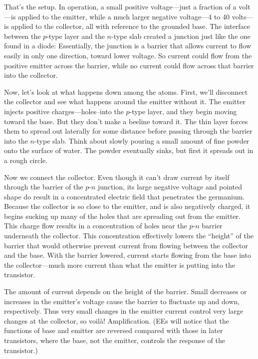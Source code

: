 \documentclass[12pt]{article}
\begin{document}
That’s the setup. In operation, a small positive voltage---just a fraction of a volt---is applied to the emitter, while a much larger negative voltage---4 to 40 volts---is applied to the collector, all with reference to the grounded base. The interface between the $p$-type layer and the $n$-type slab created a junction just like the one found in a diode: Essentially, the junction is a barrier that allows current to flow easily in only one direction, toward lower voltage. So current could flow from the positive emitter across the barrier, while no current could flow across that barrier into the collector.

Now, let’s look at what happens down among the atoms. First, we’ll disconnect the collector and see what happens around the emitter without it. The emitter injects positive charges---holes--into the $p$-type layer, and they begin moving toward the base. But they don’t make a beeline toward it. The thin layer forces them to spread out laterally for some distance before passing through the barrier into the $n$-type slab. Think about slowly pouring a small amount of fine powder onto the surface of water. The powder eventually sinks, but first it spreads out in a rough circle.

Now we connect the collector. Even though it can’t draw current by itself through the barrier of the $p$-$n$ junction, its large negative voltage and pointed shape do result in a concentrated electric field that penetrates the germanium. Because the collector is so close to the emitter, and is also negatively charged, it begins sucking up many of the holes that are spreading out from the emitter. This charge flow results in a concentration of holes near the $p$-$n$ barrier underneath the collector. This concentration effectively lowers the ``height'' of the barrier that would otherwise prevent current from flowing between the collector and the base. With the barrier lowered, current starts flowing from the base into the collector---much more current than what the emitter is putting into the transistor.

The amount of current depends on the height of the barrier. Small decreases or increases in the emitter’s voltage cause the barrier to fluctuate up and down, respectively. Thus very small changes in the emitter current control very large changes at the collector, so voil\`a! Amplification. (EEs will notice that the functions of base and emitter are reversed compared with those in later transistors, where the base, not the emitter, controls the response of the transistor.)
\end{document}
